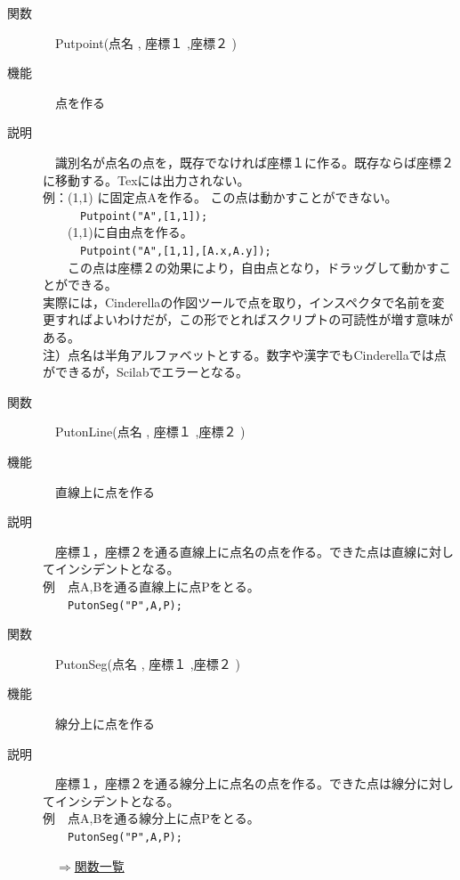 \documentclass[papersize,a4paper,12pt,uplatex]{jsarticle}
\begin{document}
\begin{description}
\hypertarget{putpoint}{}
\item[関数]　Putpoint(点名 , 座標１ ,座標２ )
\item[機能]　点を作る
\item[説明]　識別名が点名の点を，既存でなければ座標１に作る。既存ならば座標２に移動する。Texには出力されない。\\

例：(1,1) に固定点Aを作る。 この点は動かすことができない。\\
　　　\verb|Putpoint("A",[1,1]);|\\
　　(1,1)に自由点を作る。\\
　　　\verb|Putpoint("A",[1,1],[A.x,A.y]);|\\
　　この点は座標２の効果により，自由点となり，ドラッグして動かすことができる。\\

実際には，Cinderellaの作図ツールで点を取り，インスペクタで名前を変更すればよいわけだが，この形でとればスクリプトの可読性が増す意味がある。\\
注）点名は半角アルファベットとする。数字や漢字でもCinderellaでは点ができるが，Scilabでエラーとなる。\\

\hypertarget{putonline}{}
\item[関数]　PutonLine(点名 , 座標１ ,座標２ )
\item[機能]　直線上に点を作る
\item[説明]　座標１，座標２を通る直線上に点名の点を作る。できた点は直線に対してインシデントとなる。\\
例　点A,Bを通る直線上に点Pをとる。\\
　　\verb|PutonSeg("P",A,P);|\\

\hypertarget{putonseg}{}
\item[関数]　PutonSeg(点名 , 座標１ ,座標２ )
\item[機能]　線分上に点を作る
\item[説明]　座標１，座標２を通る線分上に点名の点を作る。できた点は線分に対してインシデントとなる。\\
例　点A,Bを通る線分上に点Pをとる。\\
　　\verb|PutonSeg("P",A,P);|\\

\begin{flushright}　\hyperlink{functionlist}{$\Rightarrow$関数一覧}\end{flushright}


\end{description}
\end{document}
